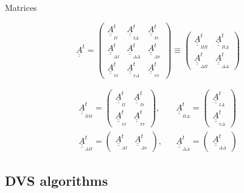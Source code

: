 \documentclass[handout]{beamer}
\newcommand{\Matriz}[1]{\underline{\underline{#1}}}
\newcommand{\SubScript}[1]{_{_{#1}}}
\begin{document}
\begin{frame}{Matrices}

\[
\Matriz{A}^t =
\left(
\begin{array}{ccc}
\Matriz{A}^{t}\SubScript{I I} & \Matriz{A}^{t}\SubScript{I\Delta} & \Matriz{A}^{t}\SubScript{I\pi} \\
\Matriz{A}^{t}\SubScript{\Delta I} & \Matriz{A}^{t}\SubScript{\Delta\Delta} & \Matriz{A}^{t}\SubScript{\Delta\pi} \\
\Matriz{A}^{t}\SubScript{\pi I} & \Matriz{A}^{t}\SubScript{\pi\Delta} & \Matriz{A}^{t}\SubScript{\pi\pi} 
\end{array}
\right) \equiv
\left( \begin{array}{cc}
\Matriz{A}^{t}\SubScript{\Pi \Pi} & \Matriz{A}^{t}\SubScript{\Pi \Delta} \\
\Matriz{A}^{t}\SubScript{\Delta \Pi} & \Matriz{A}^{t}\SubScript{\Delta\Delta} 
\end{array} \right) 
\]

\[
\begin{array}{ccc}
\Matriz{A}^{t}\SubScript{\Pi \Pi} =
\left( \begin{array}{cc}
\Matriz{A}^{t}\SubScript{I I} & \Matriz{A}^{t}\SubScript{I\pi} \\
\Matriz{A}^{t}\SubScript{\pi I} & \Matriz{A}^{t}\SubScript{\pi\pi} 
\end{array} \right), & &
\Matriz{A}^{t}\SubScript{\Pi \Delta} =
\left( \begin{array}{c}
\Matriz{A}^{t}\SubScript{I\Delta} \\
\Matriz{A}^{t}\SubScript{\pi\Delta} 
\end{array} \right)  \\
\Matriz{A}^{t}\SubScript{\Delta \Pi} =
\left( \begin{array}{cc}
\Matriz{A}^{t}\SubScript{\Delta I} & \Matriz{A}^{t}\SubScript{\Delta\pi} 
\end{array} \right), & &
\Matriz{A}^{t}\SubScript{\Delta\Delta} =
\left( \begin{array}{c}
\Matriz{A}^{t}\SubScript{\Delta \Delta} 
\end{array} \right)
\end{array}
\]

\end{frame}

\subsection{DVS algorithms}
\end{document}
